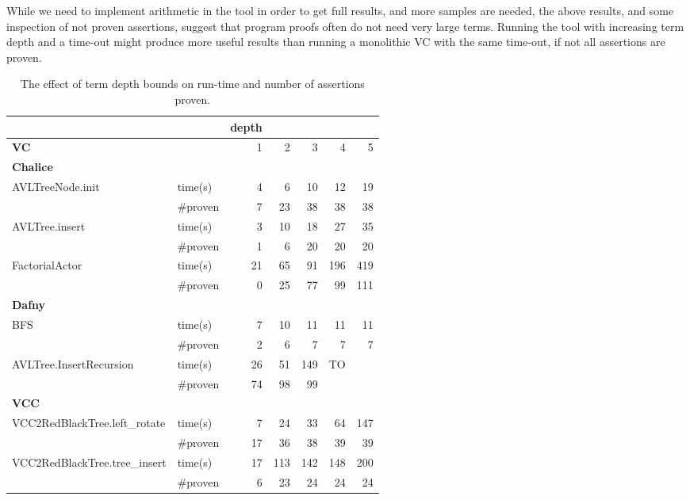 While we need to implement arithmetic in the tool in order to get full results, and more samples are needed, 
the above results, and some inspection of not proven assertions, suggest that program proofs often do not need very large terms. Running the tool with increasing term depth and a time-out might produce more useful results than running a monolithic VC with the same time-out, if not all assertions are proven.

\begin{table}
\captionsetup{width=0.8\textwidth}
\caption{The effect of term depth bounds on run-time and number of assertions proven.}
\label{fig_bounded_depth}
\centering
\scriptsize
\begin{tabular}{|l||l||r|r|r|r|r|}
\hline
                         &                    & \textbf{depth}   &    &    &    &     \\
\hline
\textbf{VC}              &                    & 1  & 2   &   3 &   4 &   5  \\
\hline
\textbf{Chalice}  & &&&&&\\
AVLTreeNode.init &  time(s) & 4	 & 6	 &  10 &  12 &	19  \\
          &  \#proven  & 7	 & 23	 &  38 &	38 &  38  \\
\hline
AVLTree.insert   &  time(s) & 3  &	10 &	18 &	27 &	35  \\
                  &  \#proven  & 1	 &   6 &	20 &	20 &	20  \\
\hline
FactorialActor   &  time(s) & 21 & 	65 &	91 & 196 &	419 \\
                 &  \#proven  & 0	 &  25 &  77 &  99 & 	111 \\
\hline
\textbf{Dafny}  & &&&&&\\
\hline
BFS              &  time(s) & 7  &	10 &	11 &	11 & 11   \\
                  &  \#proven  & 2	 &   6 &   7 &   7 &  7   \\
\hline					
AVLTree.InsertRecursion   &  time(s) & 26 &	51 &	149 & TO & \\
                  &  \#proven  & 74 &	98 &  99 & & \\
\hline
\textbf{VCC}  & &&&&&\\
\hline
VCC2RedBlackTree.left\_rotate&  time(s) & 7  &	24 &	33 &	64 & 147   \\
\hline
                  &  \#proven  & 17	 &  36 &   38 &   39 &  39   \\
\hline
VCC2RedBlackTree.tree\_insert&  time(s) & 17  &	113 &	142 &	148 & 200   \\
\hline
                  &  \#proven           & 6	 &  23 &   24 &   24 &  24   \\
\hline
\end{tabular}
\end{table}



